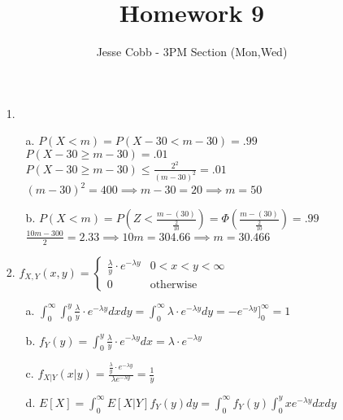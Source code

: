 \documentclass[11pt]{amsart}
\theoremstyle{definition}
\begin{document}
\title{Homework 9}

\author{Jesse Cobb - 3PM Section (Mon,Wed)}

\maketitle

\begin{itemize}

\item[1.]
\begin{itemize}
	\item[a.] $P(X<m)=P(X-30<m-30)=.99$\\
			  $P(X-30\ge m-30)=.01$\\
			  $P(X-30\ge m-30)\le\frac{2^2}{(m-30)^2}=.01$\\
			  $(m-30)^2=400\implies m-30=20\implies m=50$

		  \item[b.] $P(X<m)=P(Z<\frac{m-(30)}{\frac2{10}})=\Phi(\frac{m-(30)}{\frac2{10}})=.99$\\
			  $\frac{10m-300}2=2.33\implies 10m=304.66\implies m=30.466$
    
\end{itemize}

\item[2.] $f_{X,Y}(x,y)=\begin{cases}
	\frac\lambda y\cdot e^{-\lambda y} &0<x<y<\infty \\
	0 &\text{otherwise}
\end{cases}$
\begin{itemize}
	\item[a.] $\int_{0}^\infty\int_0^y\frac\lambda y\cdot e^{-\lambda y}dxdy=\int_0^\infty\lambda\cdot e^{-\lambda y}dy=-e^{-\lambda y}]_0^\infty=1$

	\item[b.] $f_Y(y)=\int_0^y\frac\lambda y\cdot e^{-\lambda y}dx=\lambda\cdot e^{-\lambda y}$

	\item[c.] $f_{X|Y}(x|y)=\frac{\frac\lambda y\cdot e^{-\lambda y}}{\lambda e^{-\lambda y}}=\frac1y$

	\item[d.] $E[X]=\int_0^\infty E[X|Y]f_Y(y)dy=\int_0^\infty f_Y(y)\int_0^yxe^{-\lambda y}dxdy$
    
\end{itemize}


\end{itemize}
\end{document}
